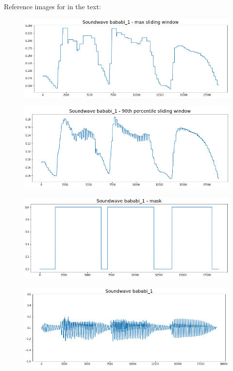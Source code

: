 \begin{appendices}
	Reference images for in the text:
	\begin{figure}
		\centering
		\includegraphics[width=0.7\linewidth]{screenshot012}
		\caption{}
		\label{fig:max sliding window}
	\end{figure}
	
	\begin{figure}
		\centering
		\includegraphics[width=0.7\linewidth]{screenshot013}
		\caption{}
		\label{fig:90th percentile}
	\end{figure}
	
	\begin{figure}
		\centering
		\includegraphics[width=0.7\linewidth]{screenshot014}
		\caption{}
		\label{fig:mask}
	\end{figure}
	
	\begin{figure}
		\centering
		\includegraphics[width=0.7\linewidth]{screenshot017}
		\caption{}
		\label{fig:full sound wave adjusted yaxis}
	\end{figure}
	

\end{appendices}
